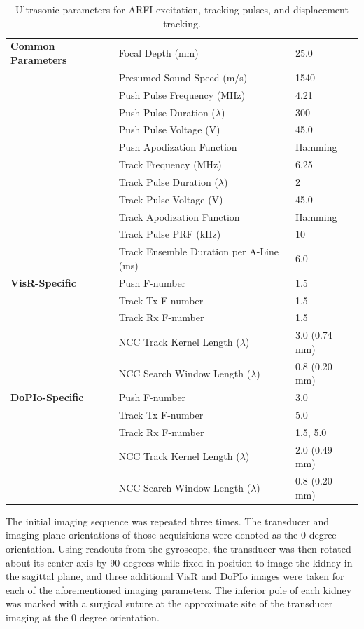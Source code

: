 \begin{table}[htb]
    \centering
    \caption{Ultrasonic parameters for ARFI excitation, tracking pulses, and displacement tracking.}
    \begin{tabular}{lll}
    \hline
    \textbf{Common Parameters} & Focal Depth (mm) & 25.0 \\
    \textbf{} & Presumed Sound Speed (m/s) & 1540 \\
    \textbf{} & Push Pulse Frequency (MHz) & 4.21 \\
    \textbf{} & Push Pulse Duration ($\lambda$) & 300 \\
    \textbf{} & Push Pulse Voltage (V) & 45.0 \\
    \textbf{} & Push Apodization Function & Hamming \\
    \textbf{} & Track Frequency (MHz) & 6.25 \\
    \textbf{} & Track Pulse Duration ($\lambda$) & 2 \\
    \textbf{} & Track Pulse Voltage (V) & 45.0 \\
    \textbf{} & Track Apodization Function & Hamming \\
    \textbf{} & Track Pulse PRF (kHz) & 10 \\
    \textbf{} & Track Ensemble Duration per A-Line (ms) & 6.0 \\ \hline
    \textbf{VisR-Specific} & Push F-number & 1.5 \\
    \textbf{} & Track Tx F-number & 1.5 \\
    \textbf{} & Track Rx F-number & 1.5 \\
    \textbf{} & NCC Track Kernel Length ($\lambda$) & 3.0 (0.74 mm) \\
    \textbf{} & NCC Search Window Length ($\lambda$) & 0.8 (0.20 mm) \\ \hline
    \textbf{DoPIo-Specific} & Push F-number & 3.0 \\
    \textbf{} & Track Tx F-number & 5.0 \\
    \textbf{} & Track Rx F-number & 1.5, 5.0 \\
    \textbf{} & NCC Track Kernel Length ($\lambda$) & 2.0 (0.49 mm)\\
    \textbf{} & NCC Search Window Length ($\lambda$) & 0.8 (0.20 mm) \\ \hline
    \end{tabular}
    \label{tbl:iriparam}
\end{table}

The initial imaging sequence was repeated three times. The transducer and imaging plane orientations of those acquisitions were denoted as the 0 degree orientation. Using readouts from the gyroscope, the transducer was then rotated about its center axis by 90 degrees while fixed in position to image the kidney in the sagittal plane, and three additional VisR and DoPIo images were taken for each of the aforementioned imaging parameters. The inferior pole of each kidney was marked with a surgical suture at the approximate site of the transducer imaging at the 0 degree orientation.

